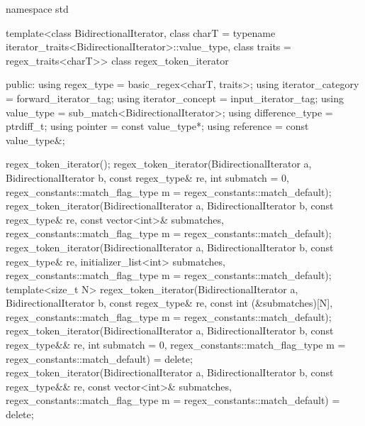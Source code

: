 \begin{codeblock}
namespace std {
  template<class BidirectionalIterator,
           class charT = typename iterator_traits<BidirectionalIterator>::value_type,
           class traits = regex_traits<charT>>
    class regex_token_iterator {
    public:
      using regex_type        = basic_regex<charT, traits>;
      using iterator_category = forward_iterator_tag;
      using iterator_concept  = input_iterator_tag;
      using value_type        = sub_match<BidirectionalIterator>;
      using difference_type   = ptrdiff_t;
      using pointer           = const value_type*;
      using reference         = const value_type&;

      regex_token_iterator();
      regex_token_iterator(BidirectionalIterator a, BidirectionalIterator b,
                           const regex_type& re,
                           int submatch = 0,
                           regex_constants::match_flag_type m =
                             regex_constants::match_default);
      regex_token_iterator(BidirectionalIterator a, BidirectionalIterator b,
                           const regex_type& re,
                           const vector<int>& submatches,
                           regex_constants::match_flag_type m =
                             regex_constants::match_default);
      regex_token_iterator(BidirectionalIterator a, BidirectionalIterator b,
                           const regex_type& re,
                           initializer_list<int> submatches,
                           regex_constants::match_flag_type m =
                             regex_constants::match_default);
      template<size_t N>
        regex_token_iterator(BidirectionalIterator a, BidirectionalIterator b,
                             const regex_type& re,
                             const int (&submatches)[N],
                             regex_constants::match_flag_type m =
                               regex_constants::match_default);
      regex_token_iterator(BidirectionalIterator a, BidirectionalIterator b,
                           const regex_type&& re,
                           int submatch = 0,
                           regex_constants::match_flag_type m =
                             regex_constants::match_default) = delete;
      regex_token_iterator(BidirectionalIterator a, BidirectionalIterator b,
                           const regex_type&& re,
                           const vector<int>& submatches,
                           regex_constants::match_flag_type m =
                             regex_constants::match_default) = delete;
}}
\end{codeblock}
